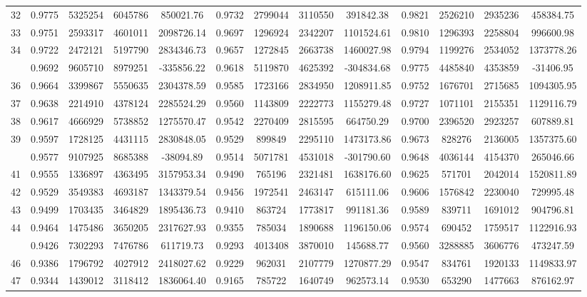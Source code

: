 \documentclass[
  12pt,
]{article}
\begin{document}
\begin{longtable}[t]{lcccccccccccc}
32 & 0.9775 & 5325254 & 6045786 & 850021.76 & 0.9732 & 2799044 & 3110550 & 391842.38 & 0.9821 & 2526210 & 2935236 & 458384.75\\
33 & 0.9751 & 2593317 & 4601011 & 2098726.14 & 0.9697 & 1296924 & 2342207 & 1101524.61 & 0.9810 & 1296393 & 2258804 & 996600.98\\
34 & 0.9722 & 2472121 & 5197790 & 2834346.73 & 0.9657 & 1272845 & 2663738 & 1460027.98 & 0.9794 & 1199276 & 2534052 & 1373778.26\\
\addlinespace
35 & 0.9692 & 9605710 & 8979251 & -335856.22 & 0.9618 & 5119870 & 4625392 & -304834.68 & 0.9775 & 4485840 & 4353859 & -31406.95\\
36 & 0.9664 & 3399867 & 5550635 & 2304378.59 & 0.9585 & 1723166 & 2834950 & 1208911.85 & 0.9752 & 1676701 & 2715685 & 1094305.95\\
37 & 0.9638 & 2214910 & 4378124 & 2285524.29 & 0.9560 & 1143809 & 2222773 & 1155279.48 & 0.9727 & 1071101 & 2155351 & 1129116.79\\
38 & 0.9617 & 4666929 & 5738852 & 1275570.47 & 0.9542 & 2270409 & 2815595 & 664750.29 & 0.9700 & 2396520 & 2923257 & 607889.81\\
39 & 0.9597 & 1728125 & 4431115 & 2830848.05 & 0.9529 & 899849 & 2295110 & 1473173.86 & 0.9673 & 828276 & 2136005 & 1357375.60\\
\addlinespace
40 & 0.9577 & 9107925 & 8685388 & -38094.89 & 0.9514 & 5071781 & 4531018 & -301790.60 & 0.9648 & 4036144 & 4154370 & 265046.66\\
41 & 0.9555 & 1336897 & 4363495 & 3157953.34 & 0.9490 & 765196 & 2321481 & 1638176.60 & 0.9625 & 571701 & 2042014 & 1520811.89\\
42 & 0.9529 & 3549383 & 4693187 & 1343379.54 & 0.9456 & 1972541 & 2463147 & 615111.06 & 0.9606 & 1576842 & 2230040 & 729995.48\\
43 & 0.9499 & 1703435 & 3464829 & 1895436.73 & 0.9410 & 863724 & 1773817 & 991181.36 & 0.9589 & 839711 & 1691012 & 904796.81\\
44 & 0.9464 & 1475486 & 3650205 & 2317627.93 & 0.9355 & 785034 & 1890688 & 1196150.06 & 0.9574 & 690452 & 1759517 & 1122916.93\\
\addlinespace
45 & 0.9426 & 7302293 & 7476786 & 611719.73 & 0.9293 & 4013408 & 3870010 & 145688.77 & 0.9560 & 3288885 & 3606776 & 473247.59\\
46 & 0.9386 & 1796792 & 4027912 & 2418027.62 & 0.9229 & 962031 & 2107779 & 1270877.29 & 0.9547 & 834761 & 1920133 & 1149833.97\\
47 & 0.9344 & 1439012 & 3118412 & 1836064.40 & 0.9165 & 785722 & 1640749 & 962573.14 & 0.9530 & 653290 & 1477663 & 876162.97\\

\end{longtable}
\end{document}
